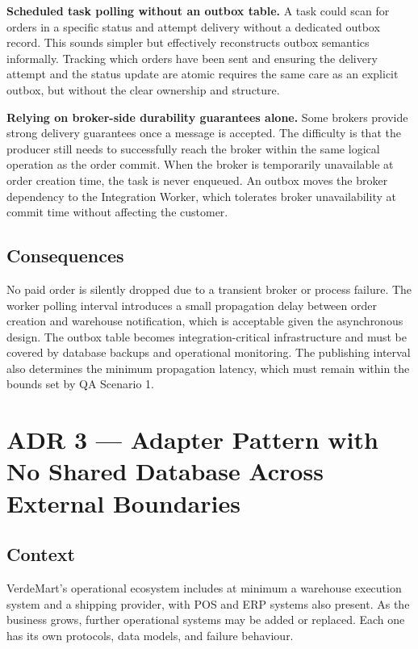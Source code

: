 \textbf{Scheduled task polling without an outbox table.} A task could scan for orders in a
specific status and attempt delivery without a dedicated outbox record. This sounds simpler but
effectively reconstructs outbox semantics informally. Tracking which orders have been sent and
ensuring the delivery attempt and the status update are atomic requires the same care as an
explicit outbox, but without the clear ownership and structure.

\textbf{Relying on broker-side durability guarantees alone.} Some brokers provide strong
delivery guarantees once a message is accepted. The difficulty is that the producer still needs
to successfully reach the broker within the same logical operation as the order commit. When
the broker is temporarily unavailable at order creation time, the task is never enqueued. An
outbox moves the broker dependency to the Integration Worker, which tolerates broker
unavailability at commit time without affecting the customer.

\subsection{Consequences}

No paid order is silently dropped due to a transient broker or process failure. The worker
polling interval introduces a small propagation delay between order creation and warehouse notification,
which is acceptable given the asynchronous design. The outbox table becomes
integration-critical infrastructure and must be covered by database backups and operational
monitoring. The publishing interval also determines the minimum propagation latency, which must
remain within the bounds set by QA Scenario 1.

\section{ADR 3 — Adapter Pattern with No Shared Database Across External Boundaries}

\subsection{Context}

VerdeMart's operational ecosystem includes at minimum a warehouse execution system and a
shipping provider, with POS and ERP systems also present. As the business grows, further
operational systems may be added or replaced. Each one has its own protocols, data models, and
failure behaviour.

